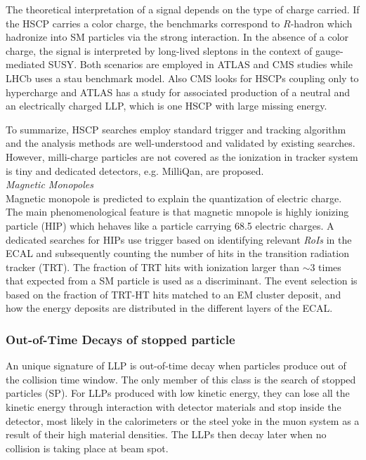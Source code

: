 The theoretical interpretation of a signal depends on the type of charge carried. If the HSCP carries a color charge, the benchmarks correspond to $R$-hadron which hadronize into SM particles via the strong interaction. In the absence of a color charge, the signal is interpreted by long-lived sleptons in the context of gauge-mediated SUSY. Both scenarios are employed in ATLAS and CMS studies while LHCb uses a stau benchmark model.  Also CMS looks for HSCPs coupling only to hypercharge and ATLAS has a study for associated production of a neutral and an electrically charged LLP, which is one HSCP with large missing energy. 

To summarize, HSCP searches employ standard trigger and tracking algorithm  and the analysis methods are well-understood and validated by existing searches. However, milli-charge particles are not covered as the ionization in tracker system is tiny and  dedicated detectors, e.g. MilliQan, are proposed.\\

\textit{Magnetic Monopoles}\\

Magnetic monopole is predicted to explain the quantization of electric charge. The main phenomenological feature is that magnetic mnopole is highly ionizing particle (HIP) which hehaves like a particle carrying 68.5 electric charges. A dedicated searches for HIPs use trigger based on identifying relevant \textit{RoIs} in the ECAL and subsequently counting the number of hits in the transition radiation tracker (TRT). The fraction of TRT hits with ionization larger than $\sim 3$ times that expected from a SM particle is used as a discriminant. The event selection is based on the fraction of TRT-HT hits matched to an EM cluster deposit, and how the energy deposits are distributed in the different layers of the ECAL. 


\subsubsection{Out-of-Time Decays of stopped particle}

An unique signature of LLP is out-of-time decay when particles produce out of the collision time window. The only member of this class is the search of stopped particles (SP). For LLPs produced with low kinetic energy, they can lose all the kinetic energy through interaction with detector materials and stop inside the detector, most likely in the calorimeters or the steel yoke in the muon system as a result of their high material densities. The LLPs then decay later when no collision is taking place at beam spot. 

